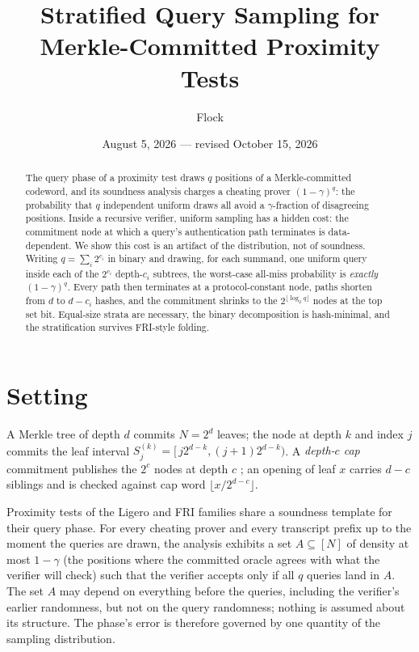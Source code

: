 \documentclass[11pt]{article}
\title{Stratified Query Sampling for\\ Merkle-Committed Proximity Tests}
\author{Flock}
\date{August 5, 2026 --- revised October 15, 2026}
\newcommand{\N}{N}
\theoremstyle{definition}
\begin{document}
\maketitle

\begin{abstract}
The query phase of a proximity test draws $q$ positions of a
Merkle-committed codeword, and its soundness analysis charges a cheating
prover $(1-\gamma)^q$: the probability that $q$ independent uniform draws
all avoid a $\gamma$-fraction of disagreeing positions. Inside a
recursive verifier, uniform sampling has a hidden cost: the commitment
node at which a query's authentication path terminates is data-dependent.
We show this cost is an artifact of the distribution, not of soundness.
Writing $q = \sum_i 2^{c_i}$ in binary and drawing, for each summand,
one uniform query inside each of the $2^{c_i}$ depth-$c_i$ subtrees, the
worst-case all-miss probability is \emph{exactly} $(1-\gamma)^q$. Every
path then terminates at a protocol-constant node, paths shorten from
$d$ to $d - c_i$ hashes, and the commitment shrinks to the
$2^{\lfloor \log_2 q \rfloor}$ nodes at the top set bit. Equal-size
strata are necessary, the binary decomposition is hash-minimal, and the
stratification survives FRI-style folding.
\end{abstract}

\section{Setting}

A Merkle tree of depth $d$ commits $\N = 2^d$ leaves; the node at depth
$k$ and index $j$ commits the leaf interval
$S^{(k)}_j = [\, j 2^{d-k}, (j+1) 2^{d-k})$. A \emph{depth-$c$ cap}
commitment publishes the $2^c$ nodes at depth $c$
\cite{plonky2}; an opening of leaf $x$ carries $d - c$ siblings and is
checked against cap word $\lfloor x / 2^{d-c} \rfloor$.

Proximity tests of the Ligero and FRI families \cite{ligero,ligerito,fri}
share a soundness template for their query phase. For every cheating
prover and every transcript prefix up to the moment the queries are
drawn, the analysis exhibits a set $A \subseteq [\N]$ of density at most
$1-\gamma$ (the positions where the committed oracle agrees with what the
verifier will check) such that the verifier accepts only if all $q$
queries land in $A$. The set $A$ may depend on everything before the
queries, including the verifier's earlier randomness, but not on the
query randomness; nothing is assumed about its structure. The phase's
error is therefore governed by one quantity of the sampling distribution.
\end{document}
